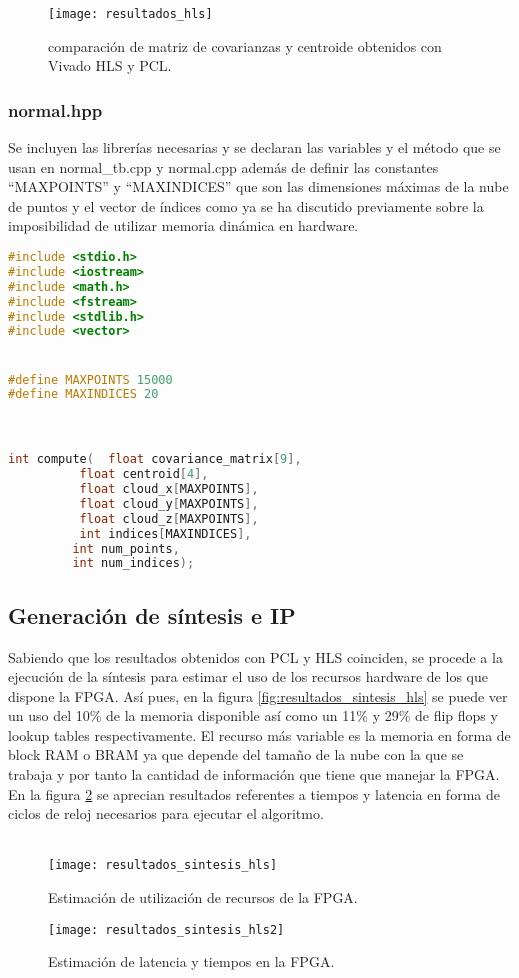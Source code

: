 \begin{figure}[!htb]
\centering
\texttt{[image: resultados\_hls]}
\caption{comparación de matriz de covarianzas y centroide obtenidos con Vivado HLS y PCL.}\label{fig:resultados_hls}
\end{figure}

\subsubsection{normal.hpp}
Se incluyen las librerías necesarias y se declaran las variables y el método que se usan en normal\_tb.cpp y normal.cpp además de definir las constantes ``MAXPOINTS'' y ``MAXINDICES'' que son las dimensiones máximas de la nube de puntos y el vector de índices como ya se ha discutido previamente sobre la imposibilidad de utilizar memoria dinámica en hardware.

\begin{lstlisting}[language=C++,breaklines]
#include <stdio.h>
#include <iostream>
#include <math.h>
#include <fstream>
#include <stdlib.h>
#include <vector>


#define MAXPOINTS 15000
#define MAXINDICES 20



int compute(  float covariance_matrix[9],
		  float centroid[4],
		  float cloud_x[MAXPOINTS],
		  float cloud_y[MAXPOINTS],
		  float cloud_z[MAXPOINTS],
		  int indices[MAXINDICES],
		 int num_points,
		 int num_indices);

\end{lstlisting}


\subsection{Generación de síntesis e IP}

Sabiendo que los resultados obtenidos con PCL y HLS coinciden, se procede a la ejecución de la síntesis para estimar el uso de los recursos hardware de los que dispone la FPGA. Así pues, en la figura \ref{fig:resultados_sintesis_hls} se puede ver un uso del 10\% de la memoria disponible así como un 11\% y 29\% de flip flops y lookup tables respectivamente. El recurso más variable es la memoria en forma de block RAM o BRAM ya que depende del tamaño de la nube con la que se trabaja y por tanto la cantidad de información que tiene que manejar la FPGA. En la figura \ref{fig:resultados_sintesis_hls2} se aprecian resultados referentes a tiempos y latencia en forma de ciclos de reloj necesarios para ejecutar el algoritmo.
\\
\\
\begin{figure}[!htb]
  \texttt{[image: resultados\_sintesis\_hls]}
  \caption{Estimación de utilización de recursos de la FPGA.}\label{fig:resultados_sintesis_hls}
\endminipage\hfill
{}
  \texttt{[image: resultados\_sintesis\_hls2]}
  \caption{Estimación de latencia y tiempos en la FPGA.}\label{fig:resultados_sintesis_hls2}
\endminipage\hfill
\end{figure}

